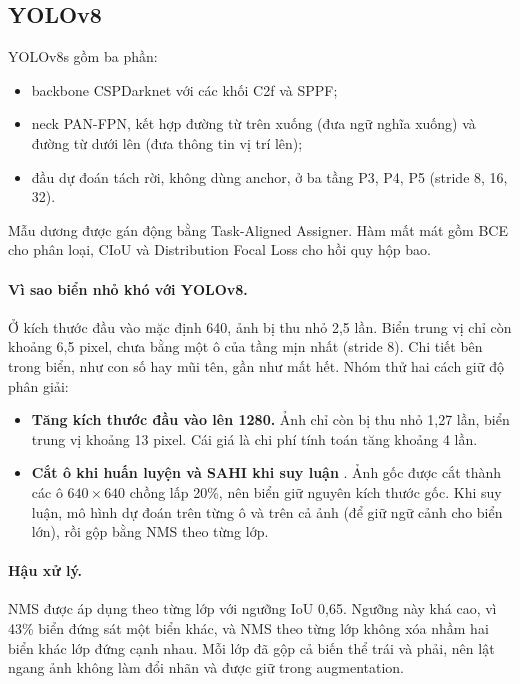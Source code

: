 \subsection{YOLOv8}
\label{sec:yolo}

YOLOv8s \citep{jocher2023ultralytics} gồm ba phần:
\begin{itemize}
\item backbone CSPDarknet với các khối C2f và SPPF;
\item neck PAN-FPN, kết hợp đường từ trên xuống (đưa ngữ nghĩa xuống) và đường từ dưới lên (đưa thông tin vị trí lên);
\item đầu dự đoán tách rời, không dùng anchor, ở ba tầng P3, P4, P5 (stride 8, 16, 32).
\end{itemize}
Mẫu dương được gán động bằng Task-Aligned Assigner. Hàm mất mát gồm BCE cho phân loại, CIoU và Distribution Focal Loss cho hồi quy hộp bao.

\paragraph{Vì sao biển nhỏ khó với YOLOv8.}
Ở kích thước đầu vào mặc định 640, ảnh bị thu nhỏ 2,5 lần. Biển trung vị chỉ còn khoảng 6,5 pixel, chưa bằng một ô của tầng mịn nhất (stride 8). Chi tiết bên trong biển, như con số hay mũi tên, gần như mất hết.
Nhóm thử hai cách giữ độ phân giải:
\begin{itemize}
\item \textbf{Tăng kích thước đầu vào lên 1280.} Ảnh chỉ còn bị thu nhỏ 1,27 lần, biển trung vị khoảng 13 pixel. Cái giá là chi phí tính toán tăng khoảng 4 lần.
\item \textbf{Cắt ô khi huấn luyện và SAHI khi suy luận} \citep{akyon2022sahi}. Ảnh gốc được cắt thành các ô $640 \times 640$ chồng lấp 20\%, nên biển giữ nguyên kích thước gốc. Khi suy luận, mô hình dự đoán trên từng ô và trên cả ảnh (để giữ ngữ cảnh cho biển lớn), rồi gộp bằng NMS theo từng lớp.
\end{itemize}

\paragraph{Hậu xử lý.}
NMS được áp dụng theo từng lớp với ngưỡng IoU 0,65. Ngưỡng này khá cao, vì 43\% biển đứng sát một biển khác, và NMS theo từng lớp không xóa nhầm hai biển khác lớp đứng cạnh nhau.
Mỗi lớp đã gộp cả biến thể trái và phải, nên lật ngang ảnh không làm đổi nhãn và được giữ trong augmentation.


